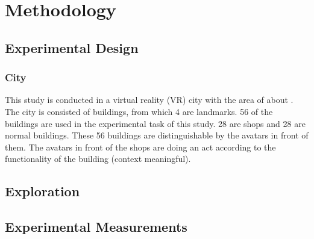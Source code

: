 \chapter{Methodology}

\section{Experimental Design}

\subsection{City}
This study is conducted in a virtual reality (VR) city with the area of about . The city is consisted of  buildings, from which 4 are landmarks. 56 of the buildings are used in the experimental task of this study. 28 are shops and 28 are normal buildings. These 56 buildings are distinguishable by the avatars \todo{[or agents?]} in front of them. The avatars in front of the shops are doing an act according to the functionality of the building (context meaningful).





\section{Exploration}

\section{Experimental Measurements}

